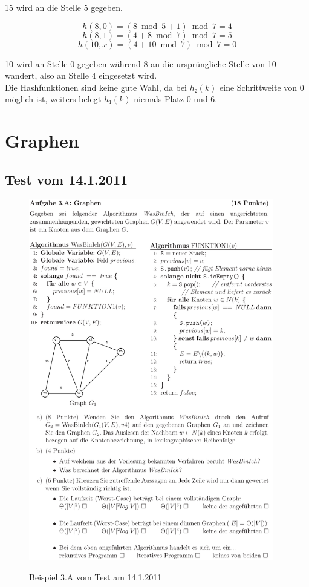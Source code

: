\documentclass[a4paper, 12pt]{article}
\begin{document}
15 wird an die Stelle 5 gegeben.

\[
	h\left(8, 0 \right) =
	\left( 8 \bmod{5} +1 \right) \bmod{7} = 4
\]
\[
	h\left(8, 1 \right) =
	\left( 4 + 8 \bmod{7} \right) \bmod{7} = 5
\]
\[
	h\left(10, x \right) =
	\left( 4 + 10 \bmod{7} \right) \bmod{7} = 0
\]

10 wird an Stelle 0 gegeben während 8 an die ursprüngliche Stelle von 10 wandert, also an Stelle 4 eingesetzt wird.\\

Die Hashfunktionen sind keine gute Wahl, da bei $h₂\left(k\right)$ eine Schrittweite von 0 möglich ist, weiters belegt $h₁\left(k\right)$ niemals Platz 0 und 6.

\section{Graphen}

\subsection{Test vom 14.1.2011}

\begin{figure}[htbp]
	\caption{Beispiel 3.A vom Test am 14.1.2011}
	\vskip 0.2cm
	\centering
	\includegraphics[width=0.95\textwidth]{Figures/Test_2011-01-14_3A}
	\label{figure:Test_2011-01-14_3A}
\end{figure}
\end{document}
